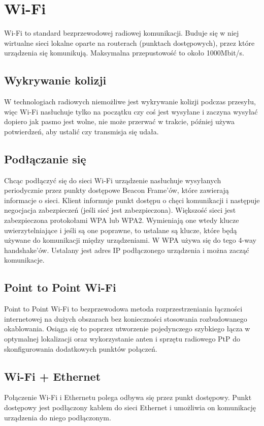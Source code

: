 \section{Wi-Fi}
Wi-Fi to standard bezprzewodowej radiowej komunikacji. Buduje się w niej wirtualne sieci lokalne oparte na routerach (punktach dostępowych), przez które urządzenia się komunikują. Maksymalna przepustowość to około 1000Mbit/s.

\subsection{Wykrywanie kolizji}
W technologiach radiowych niemożliwe jest wykrywanie kolizji podczas przesyłu, więc Wi-Fi nasłuchuje tylko na początku czy coś jest wysyłane i zaczyna wysyłać dopiero jak pasmo jest wolne, nie może przerwać w trakcie, później używa
potwierdzeń, aby ustalić czy transmisja się udała.

\subsection{Podłączanie się}
Chcąc podłączyć się do sieci Wi-Fi urządzenie nasłuchuje wysyłanych periodycznie przez punkty dostępowe Beacon Frame'ów, które zawierają informacje o sieci. Klient informuje punkt dostępu o chęci komunikacji i następuje negocjacja zabezpieczeń (jeśli sieć jest zabezpieczona). Większość sieci jest zabezpieczona protokołami WPA lub WPA2. Wymieniają one wtedy klucze uwierzytelniające i jeśli są one poprawne, to ustalane są klucze, które będą używane do komunikacji między urządzeniami. W WPA używa się do tego 4-way handshake'ów. Ustalany jest adres IP podłączonego urządzenia i można zacząć komunikacje.

\subsection{Point to Point Wi-Fi}
Point to Point Wi-Fi to bezprzewodowa metoda rozprzestrzeniania łączności internetowej na dużych obszarach bez konieczności stosowania rozbudowanego okablowania. Osiąga się to poprzez utworzenie pojedynczego szybkiego łącza w optymalnej lokalizacji oraz wykorzystanie anten i sprzętu radiowego PtP do skonfigurowania dodatkowych punktów połączeń.

\subsection{Wi-Fi + Ethernet}
Połączenie Wi-Fi i Ethernetu polega odbywa się przez punkt dostępowy. Punkt dostępowy jest podłączony kablem do sieci Ethernet i umożliwia on komunikację urządzenia do niego podłączonym.

